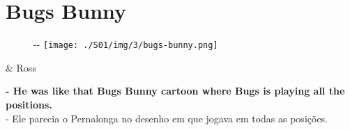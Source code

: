 \hypertarget{bugs-bunny}{%
\section{Bugs Bunny}\label{bugs-bunny}}

\begin{figure}[!ht]
  \begin{adjustwidth}{-\oddsidemargin-1in}{-\rightmargin}
    \centering
    \texttt{[image: ./S01/img/3/bugs-bunny.png]}
  \end{adjustwidth}
\end{figure}

\begin{tcolorbox}[enhanced,center upper,
    drop fuzzy shadow southeast, boxrule=0.3pt,
    lower separated=false, breakable,
    colframe=black!30!dialogoBorder,colback=white]
\begin{minipage}[c]{0.16\linewidth}
   & \centering \scriptsize{Ross}
\end{minipage}
\hfill
\begin{minipage}[c]{0.8\linewidth}
  \textbf{- He was like that Bugs Bunny cartoon where Bugs is playing all the positions.}\\
  - Ele parecia o Pernalonga no desenho em que jogava em todas as posições.
\end{minipage}
\end{tcolorbox}

